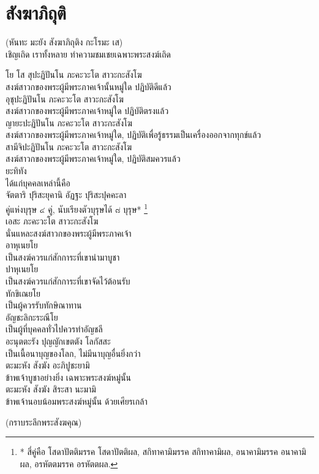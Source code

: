 \documentclass{article}
\begin{document}
\section{สังฆาภิถุติ}
\begin{center}
(หันทะ มะยัง สังฆาภิถุติง กะโรมะ เส)\\
เชิญเถิด เราทั้งหลาย ทำความชมเชยเฉพาะพระสงฆ์เถิด
\end{center}
โย โส สุปะฏิปันโน ภะคะวะโต สาวะกะสังโฆ\\
\indent สงฆ์สาวกของพระผู้มีพระภาคเจ้านั้นหมู่ใด ปฏิบัติดีแล้ว\\
อุชุปะฏิปันโน ภะคะวะโต สาวะกะสังโฆ\\
\indent สงฆ์สาวกของพระผู้มีพระภาคเจ้าหมู่ใด ปฏิบัติตรงแล้ว\\
ญายะปะฏิปันโน ภะคะวะโต สาวะกะสังโฆ\\
\indent สงฆ์สาวกของพระผู้มีพระภาคเจ้าหมู่ใด, ปฏิบัติเพื่อรู้ธรรมเป็นเครื่องออกจากทุกข์แล้ว\\
สามีจิปะฏิปันโน ภะคะวะโต สาวะกะสังโฆ\\
\indent สงฆ์สาวกของพระผู้มีพระภาคเจ้าหมู่ใด, ปฏิบัติสมควรแล้ว\\
ยะทิทัง\\
\indent ได้แก่บุคคลเหล่านี้คือ\\
จัตตาริ ปุริสะยุคานิ อัฏฐะ ปุริสะปุคคะลา\\
\indent คู่แห่งบุรุษ ๔ คู่, นับเรียงตัวบุรุษได้ ๘ บุรุษ*
\footnote{* สี่คู่คือ โสดาปัตติมรรค โสดาปัตติผล, สกิทาคามิมรรค สกิทาคามิผล,
อนาคามิมรรค อนาคามิผล, อรหัตตมรรค อรหัตตผล.}\\
เอสะ ภะคะวะโต สาวะกะสังโฆ\\
\indent นั่นแหละสงฆ์สาวกของพระผู้มีพระภาคเจ้า\\
อาหุเนยโย\\
\indent เป็นสงฆ์ควรแก่สักการะที่เขานำมาบูชา\\
ปาหุเนยโย\\
\indent เป็นสงฆ์ควรแก่สักการะที่เขาจัดไว้ต้อนรับ\\
ทักขิเณยโย\\
\indent เป็นผู้ควรรับทักษิณาทาน\\
อัญชะลิกะระณีโย\\
\indent เป็นผู้ที่บุคคลทั่วไปควรทำอัญชลี\\
อะนุตตะรัง ปุญญักเขตตัง โลกัสสะ\\
\indent เป็นเนื้อนาบุญของโลก, ไม่มีนาบุญอื่นยิ่งกว่า\\
ตะมะหัง สังฆัง อะภิปูชะยามิ\\
\indent ข้าพเจ้าบูชาอย่างยิ่ง เฉพาะพระสงฆ์หมู่นั้น\\
ตะมะหัง สังฆัง สิระสา นะมามิ\\
\indent ข้าพเจ้านอบน้อมพระสงฆ์หมู่นั้น ด้วยเศียรเกล้า
\begin{center}
(กราบระลึกพระสังฆคุณ)
\end{center}
\pagebreak
\end{document}
